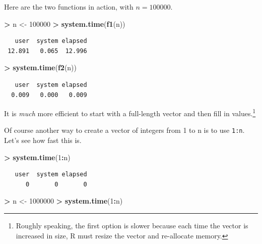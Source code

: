 \documentclass[
]{krantz}
\makeatletter
\newenvironment{Shaded}{\begin{snugshade}}{\end{snugshade}}
\newcommand{\DecValTok}[1]{\textcolor[rgb]{0.06,0.06,0.06}{#1}}
\newcommand{\KeywordTok}[1]{\textcolor[rgb]{0.27,0.27,0.27}{\textbf{#1}}}
\newcommand{\NormalTok}[1]{#1}
\newcommand{\OperatorTok}[1]{\textcolor[rgb]{0.43,0.43,0.43}{\textbf{#1}}}
\newcommand{\StringTok}[1]{\textcolor[rgb]{0.5,0.5,0.5}{#1}}
\newenvironment{kframe}{%
\medskip{}
\setlength{\fboxsep}{.8em}
 \def\at@end@of@kframe{}%
 \ifinner\ifhmode%
  \def\at@end@of@kframe{\end{minipage}}%
  \begin{minipage}{\columnwidth}%
 \fi\fi%
 \def\FrameCommand##1{\hskip\@totalleftmargin \hskip-\fboxsep
 \colorbox{shadecolor}{##1}\hskip-\fboxsep
     \hskip-\linewidth \hskip-\@totalleftmargin \hskip\columnwidth}%
 \MakeFramed {\advance\hsize-\width
   \@totalleftmargin\z@ \linewidth\hsize
   \@setminipage}}%
 {\par\unskip\endMakeFramed%
 \at@end@of@kframe}
\renewenvironment{Shaded}{\begin{kframe}}{\end{kframe}}
\makeatother
\begin{document}
Here are the two functions in action, with \(n = 100000\).

\begin{Shaded}
\begin{Highlighting}[]
\OperatorTok{\textgreater{}}\StringTok{ }\NormalTok{n \textless{}{-}}\StringTok{ }\DecValTok{100000}
\OperatorTok{\textgreater{}}\StringTok{ }\KeywordTok{system.time}\NormalTok{(}\KeywordTok{f1}\NormalTok{(n))}
\end{Highlighting}
\end{Shaded}

\begin{verbatim}
   user  system elapsed 
 12.891   0.065  12.996 
\end{verbatim}

\begin{Shaded}
\begin{Highlighting}[]
\OperatorTok{\textgreater{}}\StringTok{ }\KeywordTok{system.time}\NormalTok{(}\KeywordTok{f2}\NormalTok{(n))}
\end{Highlighting}
\end{Shaded}

\begin{verbatim}
   user  system elapsed 
  0.009   0.000   0.009 
\end{verbatim}

It is \emph{much} more efficient to start with a full-length vector and then fill in values.\footnote{Roughly speaking, the first option is slower because each time the vector is increased in size, R must resize the vector and re-allocate memory.}

Of course another way to create a vector of integers from 1 to n is to use \texttt{1:n}. Let's see how fast this is.

\begin{Shaded}
\begin{Highlighting}[]
\OperatorTok{\textgreater{}}\StringTok{ }\KeywordTok{system.time}\NormalTok{(}\DecValTok{1}\OperatorTok{:}\NormalTok{n)}
\end{Highlighting}
\end{Shaded}

\begin{verbatim}
   user  system elapsed 
      0       0       0 
\end{verbatim}

\begin{Shaded}
\begin{Highlighting}[]
\OperatorTok{\textgreater{}}\StringTok{ }\NormalTok{n \textless{}{-}}\StringTok{ }\DecValTok{1000000}
\OperatorTok{\textgreater{}}\StringTok{ }\KeywordTok{system.time}\NormalTok{(}\DecValTok{1}\OperatorTok{:}\NormalTok{n)      }
\end{Highlighting}
\end{Shaded}
\end{document}
